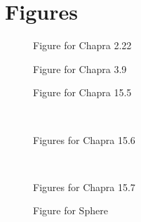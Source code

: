 \documentclass{article}
\begin{document}
\clearpage %

\section{Figures}

\begin{figure}[ht!]
\begin{center}
\caption{Figure for Chapra 2.22}
\end{center}
\end{figure}

\begin{figure}[ht!]
\begin{center}
\caption{Figure for Chapra 3.9}
\end{center}
\end{figure}

\begin{figure}[ht!]
\begin{center}
\caption{Figure for Chapra 15.5}
\end{center}
\end{figure}

\begin{figure}[ht!]
\begin{center}
\\
\caption{Figures for Chapra 15.6}
\end{center}
\end{figure}

\begin{figure}[ht!]
\begin{center}
\\
\caption{Figures for Chapra 15.7}
\end{center}
\end{figure}

\begin{figure}[ht!]
\begin{center}
\caption{Figure for Sphere}
\end{center}
\end{figure}
\end{document}
